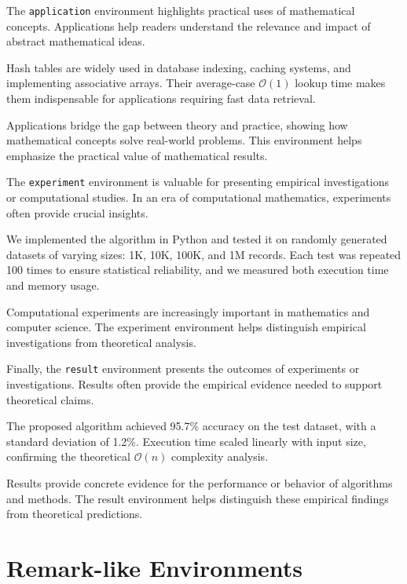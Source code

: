 \documentclass[9pt]{amsart}
\begin{document}
The \texttt{application} environment highlights practical uses of mathematical
concepts. Applications help readers understand the relevance and impact of
abstract mathematical ideas.

\begin{application}
    Hash tables are widely used in database indexing, caching systems, and implementing associative arrays. Their average-case $\mathcal{O}(1)$ lookup time makes them indispensable for applications requiring fast data retrieval.
\end{application}

Applications bridge the gap between theory and practice, showing how
mathematical concepts solve real-world problems. This environment helps
emphasize the practical value of mathematical results.

The \texttt{experiment} environment is valuable for presenting empirical
investigations or computational studies. In an era of computational
mathematics, experiments often provide crucial insights.

\begin{experiment}
    We implemented the algorithm in Python and tested it on randomly generated datasets of varying sizes: 1K, 10K, 100K, and 1M records. Each test was repeated 100 times to ensure statistical reliability, and we measured both execution time and memory usage.
\end{experiment}

Computational experiments are increasingly important in mathematics and
computer science. The experiment environment helps distinguish empirical
investigations from theoretical analysis.

Finally, the \texttt{result} environment presents the outcomes of experiments
or investigations. Results often provide the empirical evidence needed to
support theoretical claims.

\begin{result}
    The proposed algorithm achieved 95.7\% accuracy on the test dataset, with a standard deviation of 1.2\%. Execution time scaled linearly with input size, confirming the theoretical $\mathcal{O}(n)$ complexity analysis.
\end{result}

Results provide concrete evidence for the performance or behavior of algorithms
and methods. The result environment helps distinguish these empirical findings
from theoretical predictions.

\section{Remark-like Environments}
\end{document}
